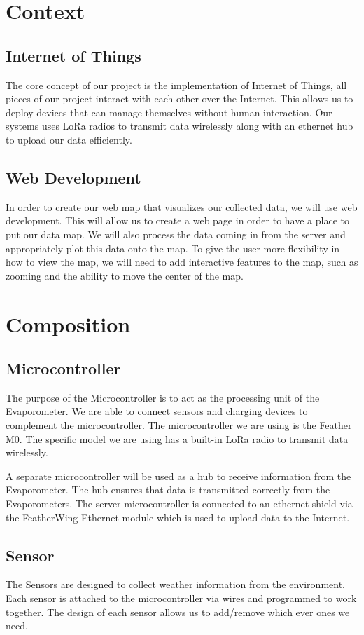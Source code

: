 \documentclass[onecolumn, draftclsnofoot,10pt, compsoc]{IEEEtran}
\begin{document}
\section{Context}
\subsection{Internet of Things}
The core concept of our project is the implementation of Internet of Things, all pieces of our project interact with each other over the Internet.  This allows us to deploy devices that can manage themselves without human interaction.  Our systems uses LoRa radios to transmit data wirelessly \cite{x1} along with an ethernet hub to upload our data efficiently.


\subsection{Web Development}
In order to create our web map that visualizes our collected data, we will use web development. This will allow us to create a web page in order to have a place to put our data map. We will also process the data coming in from the server and appropriately plot this data onto the map. To give the user more flexibility in how to view the map, we will need to add interactive features to the map, such as zooming and the ability to move the center of the map. 

\section{Composition}
\subsection{Microcontroller}
The purpose of the Microcontroller is to act as the processing unit of the Evaporometer. We are able to connect sensors and charging devices to complement the microcontroller. The microcontroller we are using is the Feather M0. The specific model we are using has a built-in LoRa radio to transmit data wirelessly. 


A separate microcontroller will be used as a hub to receive information from the Evaporometer. The hub ensures that data is transmitted correctly from the Evaporometers.  The server microcontroller is connected to an ethernet shield via the FeatherWing Ethernet module which is used to upload data to the Internet.


\subsection{Sensor}
The Sensors are designed to collect weather information from the environment. Each sensor is attached to the microcontroller via wires and programmed to work together.  The design of each sensor allows us to add/remove which ever ones we need.  
\end{document}
